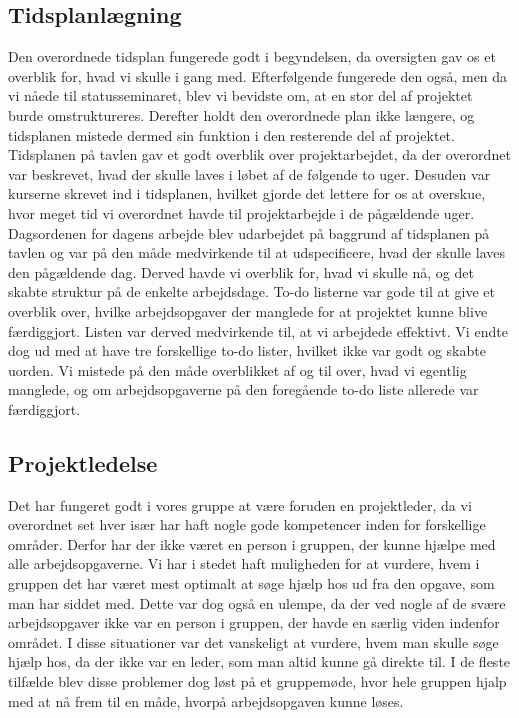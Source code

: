 \subsection{Tidsplanlægning}
Den overordnede tidsplan fungerede godt i begyndelsen, da oversigten gav os et overblik for, hvad vi skulle i gang med. Efterfølgende fungerede den også, men da vi nåede til statusseminaret, blev vi bevidste om, at en stor del af projektet burde omstruktureres. Derefter holdt den overordnede plan ikke længere, og tidsplanen mistede dermed sin funktion i den resterende del af projektet. 
Tidsplanen på tavlen gav et godt overblik over projektarbejdet, da der overordnet var beskrevet, hvad der skulle laves i løbet af de følgende to uger. Desuden var kurserne skrevet ind i tidsplanen, hvilket gjorde det lettere for os at overskue, hvor meget tid vi overordnet havde til projektarbejde i de pågældende uger. 
Dagsordenen for dagens arbejde blev udarbejdet på baggrund af tidsplanen på tavlen og var på den måde medvirkende til at udspecificere, hvad der skulle laves den pågældende dag. Derved havde vi overblik for, hvad vi skulle nå, og det skabte struktur på de enkelte arbejdsdage.
To-do listerne var gode til at give et overblik over, hvilke arbejdsopgaver der manglede for at projektet kunne blive færdiggjort. Listen var derved medvirkende til, at vi arbejdede effektivt. Vi endte dog ud med at have tre forskellige to-do lister, hvilket ikke var godt og skabte uorden. Vi mistede på den måde overblikket af og til over, hvad vi egentlig manglede, og om arbejdsopgaverne på den foregående to-do liste allerede var færdiggjort.

\subsection{Projektledelse}
Det har fungeret godt i vores gruppe at være foruden en projektleder, da vi overordnet set hver især har haft nogle gode kompetencer inden for forskellige områder. Derfor har der ikke været en person i gruppen, der kunne hjælpe med alle arbejdsopgaverne. Vi har i stedet haft muligheden for at vurdere, hvem i gruppen det har været mest optimalt at søge hjælp hos ud fra den opgave, som man har siddet med. Dette var dog også en ulempe, da der ved nogle af de svære arbejdsopgaver ikke var en person i gruppen, der havde en særlig viden indenfor området. I disse situationer var det vanskeligt at vurdere, hvem man skulle søge hjælp hos, da der ikke var en leder, som man altid kunne gå direkte til. I de fleste tilfælde blev disse problemer dog løst på et gruppemøde, hvor hele gruppen hjalp med at nå frem til en måde, hvorpå arbejdsopgaven kunne løses.

